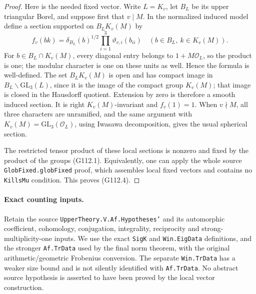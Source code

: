 \begin{proof}
Here is the needed fixed vector.  Write \(L=K_v\), let \(B_L\) be its
upper triangular Borel, and suppose first that \(v\mid M\).  In the
normalized induced model define a section supported on \(B_LK_v(M)\)
by
\[
 f_v(bk)=\delta_{B_L}(b)^{1/2}
             \prod_{i=1}^3\vartheta_{v,i}(b_{ii})
       \quad(b\in B_L,\ k\in K_v(M)).
       \tag{G112.7}
\]
For \(b\in B_L\cap K_v(M)\), every diagonal entry belongs to
\(1+M\mathcal O_L\), so the product is one; the modular character is
one on these units as well.  Hence the formula is well-defined.
The set \(B_LK_v(M)\) is open and has compact image in \(B_L\backslash
\mathrm{GL}_3(L)\), since it is the image of the compact group
\(K_v(M)\); that image is closed in the Hausdorff quotient.  Extension
by zero is therefore a smooth induced section.  It is right
\(K_v(M)\)-invariant and \(f_v(1)=1\).
When \(v\nmid M\), all three characters are unramified, and the same
argument with \(K_v(M)=\mathrm{GL}_3(\mathcal O_L)\), using Iwasawa
decomposition, gives the usual spherical section.

The restricted tensor product of these local sections is nonzero and
fixed by the product of the groups (G112.1).  Equivalently, one can
apply the whole source \texttt{GlobFixed.globFixed} proof, which
assembles local fixed vectors and contains no \texttt{KillsMu}
condition.  This proves (G112.4).
\end{proof}

\paragraph{Exact counting inputs.}
Retain the source \texttt{UpperTheory.V.Af.Hypotheses'} and its
automorphic coefficient, cohomology, conjugation, integrality,
reciprocity and strong-multiplicity-one inputs.  We use the exact
\texttt{SigK} and \texttt{Win.EigData} definitions, and the stronger
\texttt{Af.TrData} used by the final norm theorem, with the original
arithmetic/geometric Frobenius conversion.  The separate
\texttt{Win.TrData} has a weaker size bound and is not silently
identified with \texttt{Af.TrData}.  No abstract
source hypothesis is asserted to have been proved by the local vector
construction.

